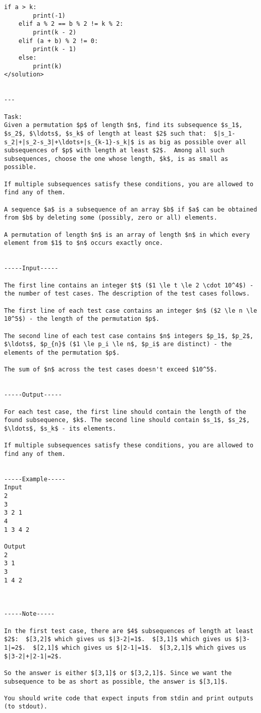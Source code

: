 \begin{lstlisting}[breaklines]
    if a > k:
        print(-1)
    elif a % 2 == b % 2 != k % 2:
        print(k - 2)
    elif (a + b) % 2 != 0:
        print(k - 1)
    else:
        print(k)
</solution>


---

Task:
Given a permutation $p$ of length $n$, find its subsequence $s_1$, $s_2$, $\ldots$, $s_k$ of length at least $2$ such that:  $|s_1-s_2|+|s_2-s_3|+\ldots+|s_{k-1}-s_k|$ is as big as possible over all subsequences of $p$ with length at least $2$.  Among all such subsequences, choose the one whose length, $k$, is as small as possible. 

If multiple subsequences satisfy these conditions, you are allowed to find any of them.

A sequence $a$ is a subsequence of an array $b$ if $a$ can be obtained from $b$ by deleting some (possibly, zero or all) elements.

A permutation of length $n$ is an array of length $n$ in which every element from $1$ to $n$ occurs exactly once.


-----Input-----

The first line contains an integer $t$ ($1 \le t \le 2 \cdot 10^4$) - the number of test cases. The description of the test cases follows.

The first line of each test case contains an integer $n$ ($2 \le n \le 10^5$) - the length of the permutation $p$.

The second line of each test case contains $n$ integers $p_1$, $p_2$, $\ldots$, $p_{n}$ ($1 \le p_i \le n$, $p_i$ are distinct) - the elements of the permutation $p$.

The sum of $n$ across the test cases doesn't exceed $10^5$.


-----Output-----

For each test case, the first line should contain the length of the found subsequence, $k$. The second line should contain $s_1$, $s_2$, $\ldots$, $s_k$ - its elements.

If multiple subsequences satisfy these conditions, you are allowed to find any of them.


-----Example-----
Input
2
3
3 2 1
4
1 3 4 2

Output
2
3 1 
3
1 4 2 



-----Note-----

In the first test case, there are $4$ subsequences of length at least $2$:  $[3,2]$ which gives us $|3-2|=1$.  $[3,1]$ which gives us $|3-1|=2$.  $[2,1]$ which gives us $|2-1|=1$.  $[3,2,1]$ which gives us $|3-2|+|2-1|=2$. 

So the answer is either $[3,1]$ or $[3,2,1]$. Since we want the subsequence to be as short as possible, the answer is $[3,1]$.

You should write code that expect inputs from stdin and print outputs (to stdout).
\end{lstlisting}


